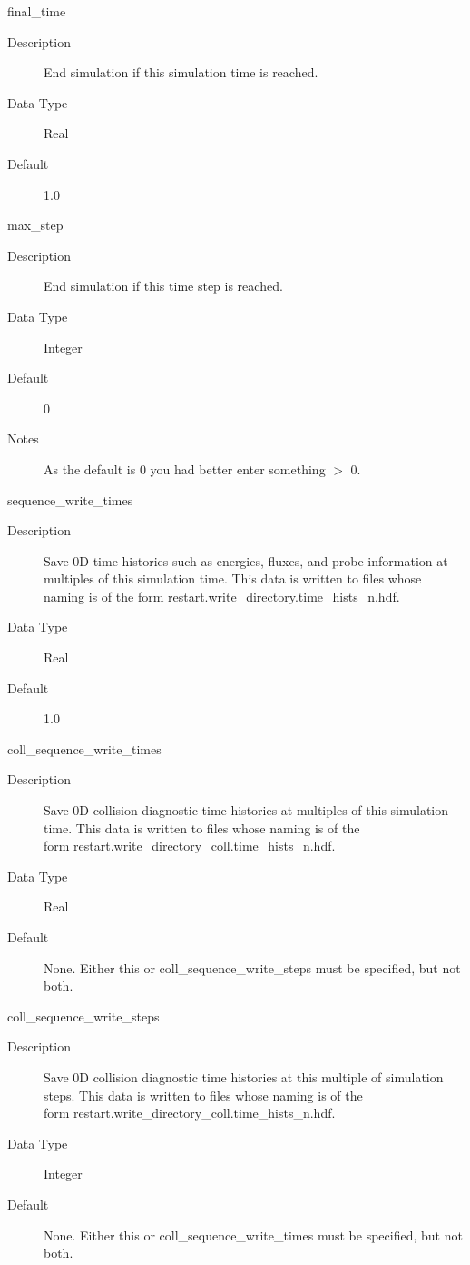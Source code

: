 \documentclass[11pt]{amsart}
\begin{document}
final\_time
\begin{description}
\item [Description] End simulation if this simulation time is reached.
\item [Data Type] Real
\item [Default] 1.0
\end{description}

max\_step
\begin{description}
\item [Description] End simulation if this time step is reached.
\item [Data Type] Integer
\item [Default] 0
\item [Notes] As the default is 0 you had better enter something $>$ 0.
\end{description}

sequence\_write\_times
\begin{description}
\item [Description] Save 0D time histories such as energies, fluxes, and probe
information at multiples of this simulation time.  This data is written to
files whose naming is of the form restart.write\_directory.time\_hists\_n.hdf.
\item [Data Type] Real
\item [Default] 1.0
\end{description}

coll\_sequence\_write\_times
\begin{description}
\item [Description] Save 0D collision diagnostic time histories at multiples of
this simulation time.  This data is written to files whose naming is of the \\
form restart.write\_directory\_coll.time\_hists\_n.hdf.
\item [Data Type] Real
\item [Default] None.  Either this or coll\_sequence\_write\_steps must be
specified, but not both.
\end{description}

coll\_sequence\_write\_steps
\begin{description}
\item [Description] Save 0D collision diagnostic time histories at this multiple
of simulation steps.  This data is written to files whose naming is of the \\
form restart.write\_directory\_coll.time\_hists\_n.hdf.
\item [Data Type] Integer
\item [Default] None.  Either this or coll\_sequence\_write\_times must be
specified, but not both.
\end{description}
\end{document}
